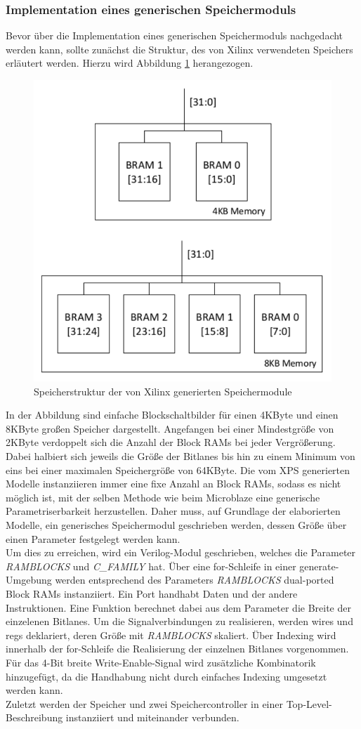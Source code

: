 \subsubsection{Implementation eines generischen Speichermoduls} \label{subsubsec:genMem}
Bevor über die Implementation eines generischen Speichermoduls nachgedacht werden kann, sollte zunächst die Struktur, des von Xilinx verwendeten Speichers erläutert werden. Hierzu wird Abbildung \ref{fig:XilinxMEM} herangezogen.
\begin{figure}[ht!]
\centering
\includegraphics[width=0.7\linewidth]{./bilder/XilinxMEM}
\caption{Speicherstruktur der von Xilinx generierten Speichermodule}
\label{fig:XilinxMEM}
\end{figure}
In der Abbildung sind einfache Blockschaltbilder für einen 4KByte und einen 8KByte großen Speicher dargestellt. Angefangen bei einer Mindestgröße von 2KByte verdoppelt sich die Anzahl der Block RAMs bei jeder Vergrößerung. Dabei halbiert sich jeweils die Größe der Bitlanes bis hin zu einem Minimum von eins bei einer maximalen Speichergröße von 64KByte. Die vom XPS generierten Modelle instanziieren immer eine fixe Anzahl an Block RAMs, sodass es nicht möglich ist, mit der selben Methode wie beim Microblaze eine generische Parametriserbarkeit herzustellen. Daher muss, auf Grundlage der elaborierten Modelle, ein generisches Speichermodul geschrieben werden, dessen Größe über einen Parameter festgelegt werden kann.\\
Um dies zu erreichen, wird ein Verilog-Modul geschrieben, welches die Parameter \textit{RAMBLOCKS} und \textit{C\_FAMILY} hat. Über eine for-Schleife in einer generate-Umgebung werden entsprechend des Parameters \textit{RAMBLOCKS} dual-ported Block RAMs instanziiert. Ein Port handhabt Daten und der andere Instruktionen. Eine Funktion berechnet dabei aus dem Parameter die Breite der einzelenen Bitlanes. Um die Signalverbindungen zu realisieren, werden wires und regs deklariert, deren Größe mit \textit{RAMBLOCKS} skaliert. Über Indexing wird innerhalb der for-Schleife die Realisierung der einzelnen Bitlanes vorgenommen. Für das 4-Bit breite Write-Enable-Signal wird zusätzliche Kombinatorik hinzugefügt, da die Handhabung nicht durch einfaches Indexing umgesetzt werden kann.\\
Zuletzt werden der Speicher und zwei Speichercontroller in einer Top-Level-Beschreibung instanziiert und miteinander verbunden.

